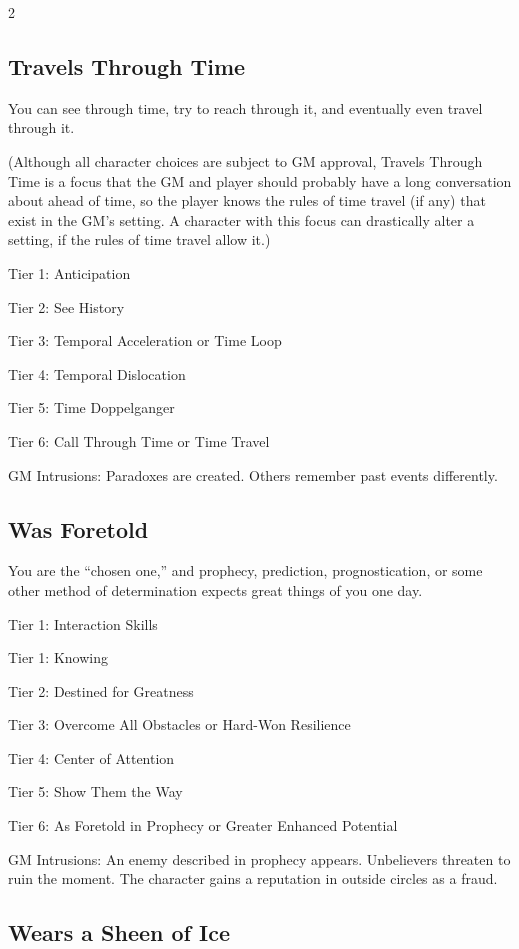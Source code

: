 \begin{multicols}{2}
\subsection{Travels Through Time}

You can see through time, try to reach through it, and eventually even travel through it.

(Although all character choices are subject to GM approval, Travels Through Time is a focus that the GM and player should probably have a long conversation about ahead of time, so the player knows the rules of time travel (if any) that exist in the GM’s setting. A character with this focus can drastically alter a setting, if the rules of time travel allow it.)

Tier 1: Anticipation

Tier 2: See History

Tier 3: Temporal Acceleration or Time Loop

Tier 4: Temporal Dislocation

Tier 5: Time Doppelganger

Tier 6: Call Through Time or Time Travel

GM Intrusions: Paradoxes are created. Others remember past events differently.

\subsection{Was Foretold}

You are the “chosen one,” and prophecy, prediction, prognostication, or some other method of determination expects great things of you one day.

Tier 1: Interaction Skills

Tier 1: Knowing

Tier 2: Destined for Greatness

Tier 3: Overcome All Obstacles or Hard-Won Resilience

Tier 4: Center of Attention

Tier 5: Show Them the Way

Tier 6: As Foretold in Prophecy or Greater Enhanced Potential

GM Intrusions: An enemy described in prophecy appears. Unbelievers threaten to ruin the moment. The character gains a reputation in outside circles as a fraud.

\subsection{Wears a Sheen of Ice}


\end{multicols}
